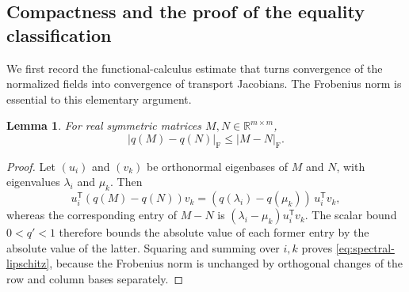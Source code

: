 \documentclass[11pt]{article}
\newcommand{\R}{\mathbb R}
\newtheorem{lemma}[theorem]{Lemma}
\theoremstyle{definition}
\theoremstyle{remark}
\numberwithin{equation}{section}
\begin{document}
\subsection{Compactness and the proof of the equality classification}

We first record the functional-calculus estimate that turns convergence
of the normalized fields into convergence of transport Jacobians.  The
Frobenius norm is essential to this elementary argument.

\begin{lemma}\label{lem:spectral-lipschitz}
For real symmetric matrices $M,N\in\R^{m\times m}$,
\begin{equation}\label{eq:spectral-lipschitz}
  |q(M)-q(N)|_{\mathrm F}\le |M-N|_{\mathrm F}.
\end{equation}
\end{lemma}

\begin{proof}
Let $(u_i)$ and $(v_k)$ be orthonormal eigenbases of $M$ and $N$, with
eigenvalues $\lambda_i$ and $\mu_k$.  Then
\[
  u_i^{\mathsf T}(q(M)-q(N))v_k
   =(q(\lambda_i)-q(\mu_k))\,u_i^{\mathsf T}v_k,
\]
whereas the corresponding entry of $M-N$ is
$(\lambda_i-\mu_k)u_i^{\mathsf T}v_k$.  The scalar bound $0<q'<1$
therefore bounds the absolute value of each former entry by the absolute
value of the latter.
Squaring and summing over $i,k$ proves \eqref{eq:spectral-lipschitz},
because the Frobenius norm is unchanged by orthogonal changes of the
row and column bases separately.
\end{proof}
\end{document}
